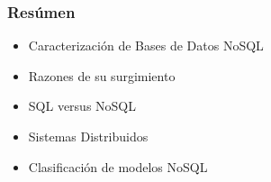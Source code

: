 \begin{frame}
    \frametitle{Resúmen}

    \begin{itemize}
        \item Caracterización de Bases de Datos NoSQL    
        \item Razones de su surgimiento                  
        \item SQL versus NoSQL                           
        \item Sistemas Distribuidos                      
        \item Clasificación de modelos NoSQL
    \end{itemize}
    
\end{frame}
